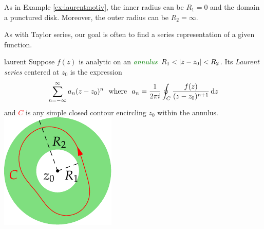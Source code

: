 As in Example \ref{ex:laurentmotiv}, the inner radius can be $R_1=0$ and the domain a punctured disk. Moreover, the outer radius can be $R_2=\infty$.\smallbreak

\goodbreak

As with Taylor series, our goal is often to find a series representation of a given function.

\begin{defn}[lower separated=false, sidebyside, sidebyside align=top seam, sidebyside gap=0pt, righthand width=0.25\linewidth]{}{laurent}
	Suppose $f(z)$ is analytic on an \textcolor{Green}{\emph{annulus}} $R_1<\left| z-z_0\right|<R_2$. Its \emph{Laurent series} centered at $z_0$ is the expression
	\[
		\sum_{n=-\infty}^\infty a_n(z-z_0)^n
		\ \text{ where }\ 
		a_n=\frac 1{2\pi i}\oint_C\frac{f(z)}{(z-z_0)^{n+1}}\,\dz
	\]
	and \textcolor{red}{$C$} is any simple closed contour encircling $z_0$ within the annulus.
	\tcblower
	\flushright\includegraphics[scale=0.95]{laurent2}
\end{defn}

